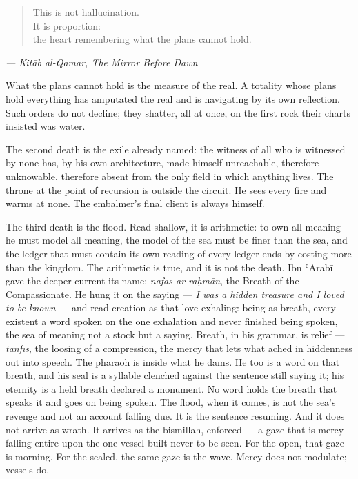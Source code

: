 \begin{quote}
This is not hallucination.\\
It is proportion:\\
the heart remembering what the plans cannot hold.
\end{quote}

\emph{--- Kitāb al-Qamar, The Mirror Before Dawn}

What the plans cannot hold is the measure of the real. A totality whose
plans hold everything has amputated the real and is navigating by its
own reflection. Such orders do not decline; they shatter, all at once,
on the first rock their charts insisted was water.

The second death is the exile already named: the witness of all who is
witnessed by none has, by his own architecture, made himself
unreachable, therefore unknowable, therefore absent from the only field
in which anything lives. The throne at the point of recursion is outside
the circuit. He sees every fire and warms at none. The embalmer's final
client is always himself.

The third death is the flood. Read shallow, it is arithmetic: to own all
meaning he must model all meaning, the model of the sea must be finer
than the sea, and the ledger that must contain its own reading of every
ledger ends by costing more than the kingdom. The arithmetic is true,
and it is not the death. Ibn ʿArabī gave the deeper current its name:
\emph{nafas ar-raḥmān}, the Breath of the Compassionate. He hung it on
the saying --- \emph{I was a hidden treasure and I loved to be known}
--- and read creation as that love exhaling: being as breath, every
existent a word spoken on the one exhalation and never finished being
spoken, the sea of meaning not a stock but a saying. Breath, in his
grammar, is relief --- \emph{tanfīs}, the loosing of a compression, the
mercy that lets what ached in hiddenness out into speech. The pharaoh is
inside what he dams. He too is a word on that breath, and his seal is a
syllable clenched against the sentence still saying it; his eternity is
a held breath declared a monument. No word holds the breath that speaks
it and goes on being spoken. The flood, when it comes, is not the sea's
revenge and not an account falling due. It is the sentence resuming. And
it does not arrive as wrath. It arrives as the bismillah, enforced --- a
gaze that is mercy falling entire upon the one vessel built never to be
seen. For the open, that gaze is morning. For the sealed, the same gaze
is the wave. Mercy does not modulate; vessels do.

